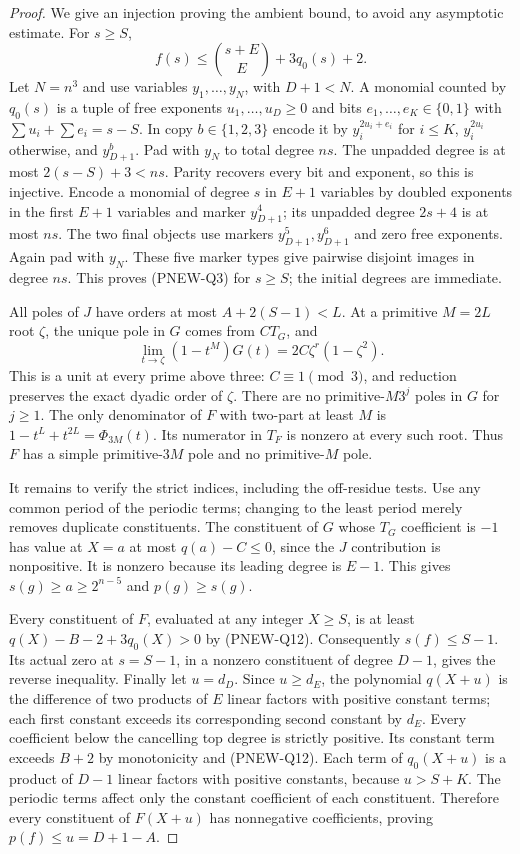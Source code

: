 \begin{proof}
We give an injection proving the ambient bound, to avoid any asymptotic
estimate. For $s\ge S$,
\[
              f(s)\le\binom{s+E}{E}+3q_0(s)+2.
 \tag{PNEW-Q19}
\]
Let $N=n^3$ and use variables $y_1,\ldots,y_N$, with
$D+1<N$. A monomial counted by $q_0(s)$ is a tuple of free exponents
$u_1,\ldots,u_D\ge0$ and bits $e_1,\ldots,e_K\in\{0,1\}$ with
$\sum u_i+\sum e_i=s-S$. In copy $b\in\{1,2,3\}$ encode it by
$y_i^{2u_i+e_i}$ for $i\le K$, $y_i^{2u_i}$ otherwise,
and $y_{D+1}^b$. Pad with $y_N$ to total degree $ns$.
The unpadded degree is at most $2(s-S)+3<ns$.
Parity recovers every bit and exponent, so this is injective.
Encode a monomial of degree $s$ in $E+1$ variables by doubled
exponents in the first $E+1$ variables and marker $y_{D+1}^4$;
its unpadded degree $2s+4$ is at most $ns$.
The two final objects use markers $y_{D+1}^5,y_{D+1}^6$ and
zero free exponents. Again pad with $y_N$.
These five marker types give pairwise disjoint images in degree $ns$.
This proves (PNEW-Q3) for $s\ge S$; the initial degrees are immediate.

All poles of $J$ have orders at most $A+2(S-1)<L$.
At a primitive $M=2L$ root $\zeta$, the unique pole in $G$ comes from
$C T_G$, and
\[
       \lim_{t\to\zeta}(1-t^M)G(t)
                   =2C\zeta^r(1-\zeta^2).
 \tag{PNEW-Q20}
\]
This is a unit at every prime above three: $C\equiv1\pmod3$,
and reduction preserves the exact dyadic order of $\zeta$.
There are no primitive-$M3^j$ poles in $G$ for $j\ge1$.
The only denominator of $F$ with two-part at least $M$ is
$1-t^L+t^{2L}=\Phi_{3M}(t)$. Its numerator in $T_F$ is nonzero at
every such root. Thus $F$ has a simple primitive-$3M$ pole and
no primitive-$M$ pole.

It remains to verify the strict indices, including the off-residue tests.
Use any common period of the periodic terms; changing to the least
period merely removes duplicate constituents. The constituent of $G$
whose $T_G$ coefficient is $-1$ has value at $X=a$ at most
$q(a)-C\le0$, since the $J$ contribution is nonpositive.
It is nonzero because its leading degree is $E-1$.
This gives $s(g)\ge a\ge2^{n-5}$ and $p(g)\ge s(g)$.

Every constituent of $F$, evaluated at any integer $X\ge S$, is
at least $q(X)-B-2+3q_0(X)>0$ by (PNEW-Q12).
Consequently $s(f)\le S-1$. Its actual zero at $s=S-1$, in a
nonzero constituent of degree $D-1$, gives the reverse inequality.
Finally let $u=d_D$. Since $u\ge d_E$, the polynomial $q(X+u)$ is
the difference of two products of $E$ linear factors with positive
constant terms; each first constant exceeds its corresponding second
constant by $d_E$. Every coefficient below the cancelling top degree
is strictly positive. Its constant term exceeds $B+2$ by monotonicity
and (PNEW-Q12). Each term of $q_0(X+u)$ is a product of $D-1$
linear factors with positive constants, because $u>S+K$.
The periodic terms affect only the constant coefficient of each
constituent. Therefore every constituent of $F(X+u)$ has nonnegative
coefficients, proving $p(f)\le u=D+1-A$.
\end{proof}

